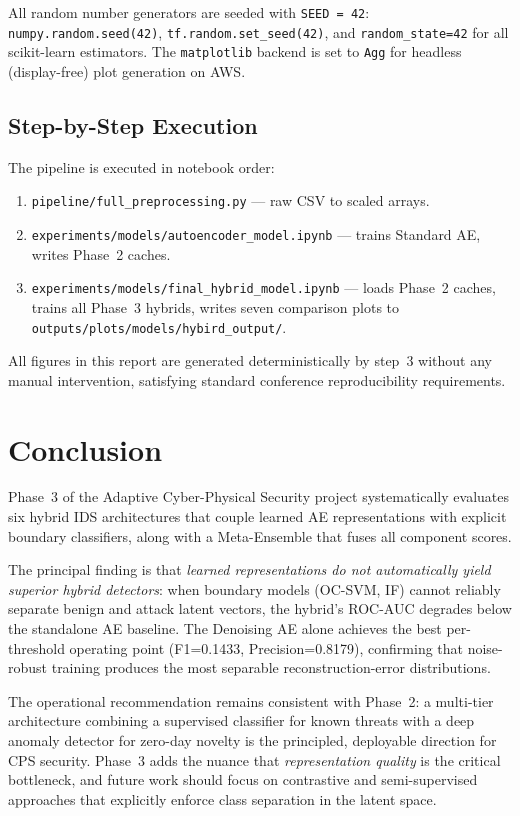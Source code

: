 \documentclass[10pt,conference]{IEEEtran}
\begin{document}
All random number generators are seeded with \texttt{SEED = 42}:
\texttt{numpy.random.seed(42)}, \texttt{tf.random.set\_seed(42)}, and
\texttt{random\_state=42} for all scikit-learn estimators.  The
\texttt{matplotlib} backend is set to \texttt{Agg} for headless
(display-free) plot generation on AWS.

\subsection{Step-by-Step Execution}

The pipeline is executed in notebook order:
\begin{enumerate}[leftmargin=*,noitemsep,topsep=0pt]
  \item \texttt{pipeline/full\_preprocessing.py} — raw CSV to scaled arrays.
  \item \texttt{experiments/models/autoencoder\_model.ipynb} — trains
        Standard AE, writes Phase~2 caches.
  \item \texttt{experiments/models/final\_hybrid\_model.ipynb} — loads
        Phase~2 caches, trains all Phase~3 hybrids, writes seven
        comparison plots to \texttt{outputs/plots/models/hybird\_output/}.
\end{enumerate}
All figures in this report are generated deterministically by step~3
without any manual intervention, satisfying standard conference
reproducibility requirements.

\section{Conclusion}
\label{sec:conclusion}

Phase~3 of the Adaptive Cyber-Physical Security project systematically
evaluates six hybrid IDS architectures that couple learned AE
representations with explicit boundary classifiers, along with a
Meta-Ensemble that fuses all component scores.

The principal finding is that \emph{learned representations do not
automatically yield superior hybrid detectors}: when boundary models
(OC-SVM, IF) cannot reliably separate benign and attack latent vectors,
the hybrid's ROC-AUC degrades below the standalone AE baseline.  The
Denoising AE alone achieves the best per-threshold operating point
(F1=0.1433, Precision=0.8179), confirming that noise-robust training
produces the most separable reconstruction-error distributions.

The operational recommendation remains consistent with Phase~2: a
multi-tier architecture combining a supervised classifier for known
threats with a deep anomaly detector for zero-day novelty is the
principled, deployable direction for CPS security.  Phase~3 adds the
nuance that \emph{representation quality} is the critical bottleneck,
and future work should focus on contrastive and semi-supervised
approaches that explicitly enforce class separation in the latent
space.

\balance


\end{document}
